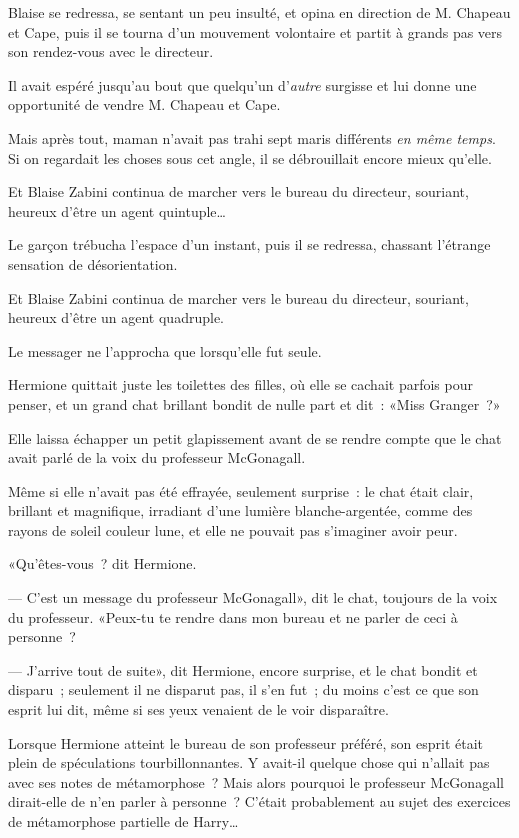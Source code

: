 Blaise se redressa, se sentant un peu insulté, et opina en direction de M. Chapeau et Cape, puis il se tourna d'un mouvement volontaire et partit à grands pas vers son rendez-vous avec le directeur.

Il avait espéré jusqu'au bout que quelqu'un d'\emph{autre} surgisse et lui donne une opportunité de vendre M. Chapeau et Cape.

Mais après tout, maman n'avait pas trahi sept maris différents \emph{en même temps}. Si on regardait les choses sous cet angle, il se débrouillait encore mieux qu'elle.

Et Blaise Zabini continua de marcher vers le bureau du directeur, souriant, heureux d'être un agent quintuple…

Le garçon trébucha l'espace d'un instant, puis il se redressa, chassant l'étrange sensation de désorientation.

Et Blaise Zabini continua de marcher vers le bureau du directeur, souriant, heureux d'être un agent quadruple.


Le messager ne l'approcha que lorsqu'elle fut seule.

Hermione quittait juste les toilettes des filles, où elle se cachait parfois pour penser, et un grand chat brillant bondit de nulle part et dit~: «Miss Granger~?»

Elle laissa échapper un petit glapissement avant de se rendre compte que le chat avait parlé de la voix du professeur McGonagall.

Même si elle n'avait pas été effrayée, seulement surprise~: le chat était clair, brillant et magnifique, irradiant d'une lumière blanche-argentée, comme des rayons de soleil couleur lune, et elle ne pouvait pas s'imaginer avoir peur.

«Qu'êtes-vous~? dit Hermione.

--- C'est un message du professeur McGonagall», dit le chat, toujours de la voix du professeur. «Peux-tu te rendre dans mon bureau et ne parler de ceci à personne~?

--- J'arrive tout de suite», dit Hermione, encore surprise, et le chat bondit et disparu~; seulement il ne disparut pas, il s'en fut~; du moins c'est ce que son esprit lui dit, même si ses yeux venaient de le voir disparaître.

Lorsque Hermione atteint le bureau de son professeur préféré, son esprit était plein de spéculations tourbillonnantes. Y avait-il quelque chose qui n'allait pas avec ses notes de métamorphose~? Mais alors pourquoi le professeur McGonagall dirait-elle de n'en parler à personne~? C'était probablement au sujet des exercices de métamorphose partielle de Harry…

